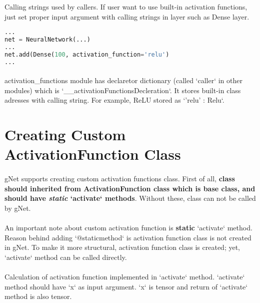 \documentclass[12pt]{report}
\begin{document}
Calling strings used by callers. If user want to use built-in activation functions, just set proper input argument with calling strings in layer such as Dense layer.

\begin{lstlisting}[language=Python, numbers=none, caption={Built-in activation function.}, 
label={lis:activation-built-in}]
...
net = NeuralNetwork(...)
...
net.add(Dense(100, activation_function='relu')
...
\end{lstlisting}

\paragraph{}
activation\_functions module has declaretor dictionary (called `caller` in other modules) which is `\_\_activationFunctionsDecleration`. It stores built-in class adresses with calling string. For example, ReLU stored as `'relu' : Relu`. 

\section{Creating Custom ActivationFunction Class}

\paragraph{}
gNet supports creating custom activation functions class. First of all, \textbf{class should inherited from ActivationFunction class which is base class, and should have \textit{static} `activate` methods}. Without these, class can not be called by gNet. 

\paragraph{}
An important note about custom activation function is \textbf{static} `activate` method. Reason behind adding `@staticmethod` is activation function class is not created in gNet. To make it more structural, activation function class is created; yet, `activate` method can be called directly. 

\paragraph{}
Calculation of activation function implemented in `activate` method. `activate` method should have `x` as input argument. `x` is tensor and return of `activate` method is also tensor. 
\end{document}
